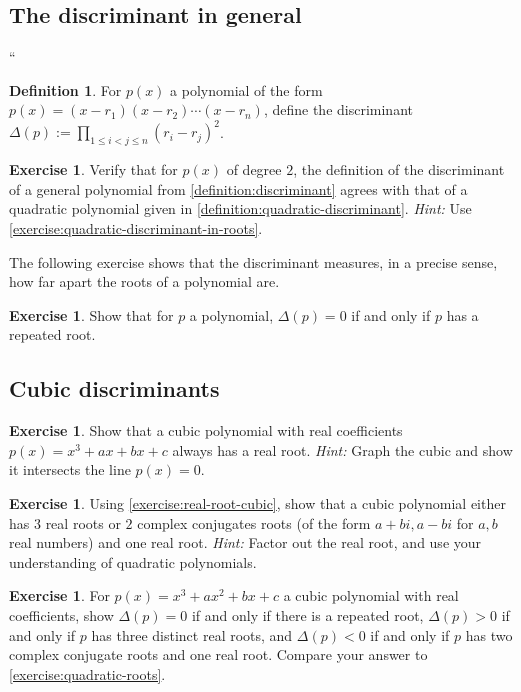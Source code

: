 \documentclass[reqno, 12pt, letter]{article}
\theoremstyle{plain}
\theoremstyle{definition}
\newtheorem{definition}[theorem]{Definition}
\newtheorem{exercise}[theorem]{Exercise}
\theoremstyle{remark}
\numberwithin{equation}{section}
\begin{document}
\subsection{The discriminant in general}
``\begin{definition}
	\label{definition:discriminant}
	For $p(x)$ a polynomial of the form $p(x) = (x-r_1)(x-r_2) \cdots (x-r_n)$,
	define the discriminant $\Delta(p) := \prod_{1 \leq i < j \leq n} (r_i - r_j)^2$.
\end{definition}
\begin{exercise}
	\label{exercise:}
	Verify that for $p(x)$ of degree $2$, the definition of the discriminant
	of a general polynomial from \autoref{definition:discriminant} agrees with
	that of a quadratic polynomial given in \autoref{definition:quadratic-discriminant}.
	{\it Hint:} Use \autoref{exercise:quadratic-discriminant-in-roots}.
\end{exercise}
The following exercise shows that the discriminant measures, in a precise sense, how far apart
the roots of a polynomial are.
\begin{exercise}
	\label{exercise:}
	Show that for $p$ a polynomial, $\Delta(p) = 0$ if and only if $p$ has a repeated root.
\end{exercise}
\subsection{Cubic discriminants}
\begin{exercise}
	\label{exercise:real-root-cubic}
	Show that a cubic polynomial with real coefficients $p(x) = x^3 + ax + bx + c$
	always has a real root.
	{\it Hint:} Graph the cubic and show it intersects the line $p(x) = 0$.
\end{exercise}
\begin{exercise}
	\label{exercise:}
	Using \autoref{exercise:real-root-cubic}, show that a cubic polynomial either has
	$3$ real roots or $2$ complex conjugates roots (of the form $a + bi, a-bi$ for $a,b$ real numbers) and one real root. 
	{\it Hint:} Factor out the real root, and use your understanding of quadratic polynomials.
\end{exercise}
\begin{exercise}
	\label{exercise:discriminant-cubic-sign}
	For $p(x) = x^3 + ax^2 + bx + c$ a cubic polynomial with real coefficients, show $\Delta(p) = 0$ if and only 
	if there is a repeated root, $\Delta(p) > 0$ if and only if $p$ has three distinct real roots, and $\Delta(p) < 0$ if and only if $p$ has two complex conjugate roots and one real root.
	Compare your answer to \autoref{exercise:quadratic-roots}.
\end{exercise}
\end{document}
